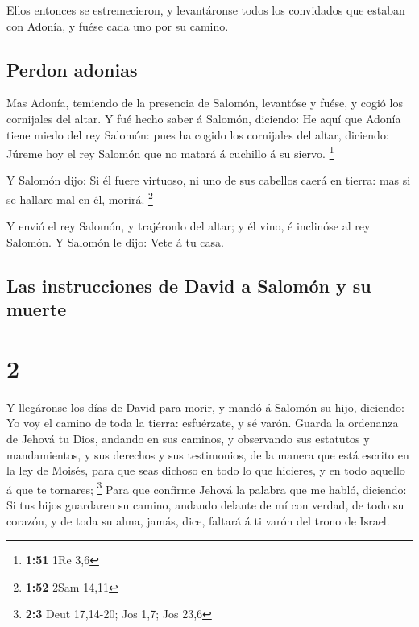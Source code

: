  Ellos entonces se estremecieron, y levantáronse todos los
convidados que estaban con Adonía, y fuése cada uno por su camino.

\hypertarget{perdon-adonias}{%
\subsection{Perdon adonias}\label{perdon-adonias}}

 Mas Adonía, temiendo de la presencia de Salomón, levantóse
y fuése, y cogió los cornijales del altar.  Y fué hecho
saber á Salomón, diciendo: He aquí que Adonía tiene miedo del rey
Salomón: pues ha cogido los cornijales del altar, diciendo: Júreme hoy
el rey Salomón que no matará á cuchillo á su siervo. \footnote{\textbf{1:51}
  1Re 3,6}

 Y Salomón dijo: Si él fuere virtuoso, ni uno de sus
cabellos caerá en tierra: mas si se hallare mal en él, morirá.
\footnote{\textbf{1:52} 2Sam 14,11}

 Y envió el rey Salomón, y trajéronlo del altar; y él vino,
é inclinóse al rey Salomón. Y Salomón le dijo: Vete á tu casa.

\hypertarget{las-instrucciones-de-david-a-salomuxf3n-y-su-muerte}{%
\subsection{Las instrucciones de David a Salomón y su
muerte}\label{las-instrucciones-de-david-a-salomuxf3n-y-su-muerte}}

\hypertarget{section-1}{%
\section{2}\label{section-1}}

 Y llegáronse los días de David para morir, y mandó á
Salomón su hijo, diciendo:  Yo voy el camino de toda la
tierra: esfuérzate, y sé varón.  Guarda la ordenanza de
Jehová tu Dios, andando en sus caminos, y observando sus estatutos y
mandamientos, y sus derechos y sus testimonios, de la manera que está
escrito en la ley de Moisés, para que seas dichoso en todo lo que
hicieres, y en todo aquello á que te tornares; \footnote{\textbf{2:3}
  Deut 17,14-20; Jos 1,7; Jos 23,6}  Para que confirme
Jehová la palabra que me habló, diciendo: Si tus hijos guardaren su
camino, andando delante de mí con verdad, de todo su corazón, y de toda
su alma, jamás, dice, faltará á ti varón del trono de Israel.

